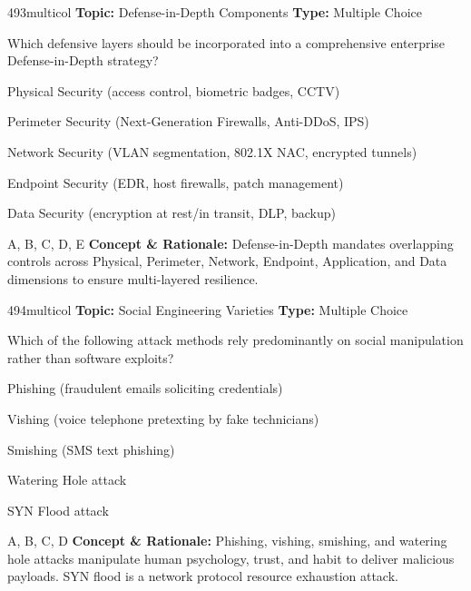 \begin{qcard}{493}{multicol}
\textcolor{darkslate!75}{\small\textbf{Topic:} Defense-in-Depth Components \hfill \textbf{Type:} Multiple Choice}\vspace{0.4em}\par
Which defensive layers should be incorporated into a comprehensive enterprise Defense-in-Depth strategy?
\begin{qoptions}
\item Physical Security (access control, biometric badges, CCTV)
\item Perimeter Security (Next-Generation Firewalls, Anti-DDoS, IPS)
\item Network Security (VLAN segmentation, 802.1X NAC, encrypted tunnels)
\item Endpoint Security (EDR, host firewalls, patch management)
\item Data Security (encryption at rest/in transit, DLP, backup)
\end{qoptions}
\end{qcard}
\nopagebreak
\begin{explainbox}{A, B, C, D, E}
\textbf{Concept \& Rationale:} Defense-in-Depth mandates overlapping controls across Physical, Perimeter, Network, Endpoint, Application, and Data dimensions to ensure multi-layered resilience.
\end{explainbox}

\begin{qcard}{494}{multicol}
\textcolor{darkslate!75}{\small\textbf{Topic:} Social Engineering Varieties \hfill \textbf{Type:} Multiple Choice}\vspace{0.4em}\par
Which of the following attack methods rely predominantly on social manipulation rather than software exploits?
\begin{qoptions}
\item Phishing (fraudulent emails soliciting credentials)
\item Vishing (voice telephone pretexting by fake technicians)
\item Smishing (SMS text phishing)
\item Watering Hole attack
\item SYN Flood attack
\end{qoptions}
\end{qcard}
\nopagebreak
\begin{explainbox}{A, B, C, D}
\textbf{Concept \& Rationale:} Phishing, vishing, smishing, and watering hole attacks manipulate human psychology, trust, and habit to deliver malicious payloads. SYN flood is a network protocol resource exhaustion attack.
\end{explainbox}

